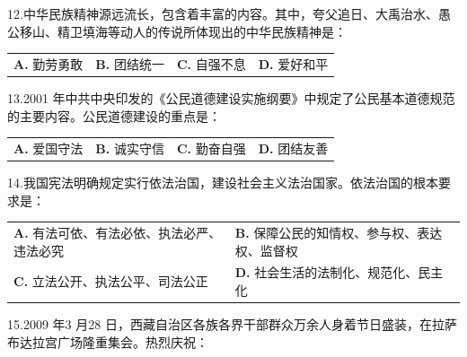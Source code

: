 \documentclass[UTF8,11pt]{ctexart}
\begin{document}
12.中华民族精神源远流长，包含着丰富的内容。其中，夸父追日、大禹治水、愚公移山、精卫填海等动人的传说所体现出的中华民族精神是：


\begin{center}\begin{tabular}{>{\raggedright\arraybackslash}p{\dimexpr(\linewidth-8\tabcolsep)/4\relax}>{\raggedright\arraybackslash}p{\dimexpr(\linewidth-8\tabcolsep)/4\relax}>{\raggedright\arraybackslash}p{\dimexpr(\linewidth-8\tabcolsep)/4\relax}>{\raggedright\arraybackslash}p{\dimexpr(\linewidth-8\tabcolsep)/4\relax}}
\textbf{A.} 勤劳勇敢 & \textbf{B.} 团结统一 & \textbf{C.} 自强不息 & \textbf{D.} 爱好和平\\[.35em]\end{tabular}\end{center}

13.2001 年中共中央印发的《公民道德建设实施纲要》中规定了公民基本道德规范的主要内容。公民道德建设的重点是：


\begin{center}\begin{tabular}{>{\raggedright\arraybackslash}p{\dimexpr(\linewidth-8\tabcolsep)/4\relax}>{\raggedright\arraybackslash}p{\dimexpr(\linewidth-8\tabcolsep)/4\relax}>{\raggedright\arraybackslash}p{\dimexpr(\linewidth-8\tabcolsep)/4\relax}>{\raggedright\arraybackslash}p{\dimexpr(\linewidth-8\tabcolsep)/4\relax}}
\textbf{A.} 爱国守法 & \textbf{B.} 诚实守信 & \textbf{C.} 勤奋自强 & \textbf{D.} 团结友善\\[.35em]\end{tabular}\end{center}

14.我国宪法明确规定实行依法治国，建设社会主义法治国家。依法治国的根本要求是：


\begin{center}\begin{tabular}{>{\raggedright\arraybackslash}p{\dimexpr(\linewidth-4\tabcolsep)/2\relax}>{\raggedright\arraybackslash}p{\dimexpr(\linewidth-4\tabcolsep)/2\relax}}
\textbf{A.} 有法可依、有法必依、执法必严、违法必究 & \textbf{B.} 保障公民的知情权、参与权、表达权、监督权\\[.35em]
\textbf{C.} 立法公开、执法公平、司法公正 & \textbf{D.} 社会生活的法制化、规范化、民主化\\[.35em]\end{tabular}\end{center}

15.2009 年3 月28 日，西藏自治区各族各界干部群众万余人身着节日盛装，在拉萨布达拉宫广场隆重集会。热烈庆祝：
\end{document}
